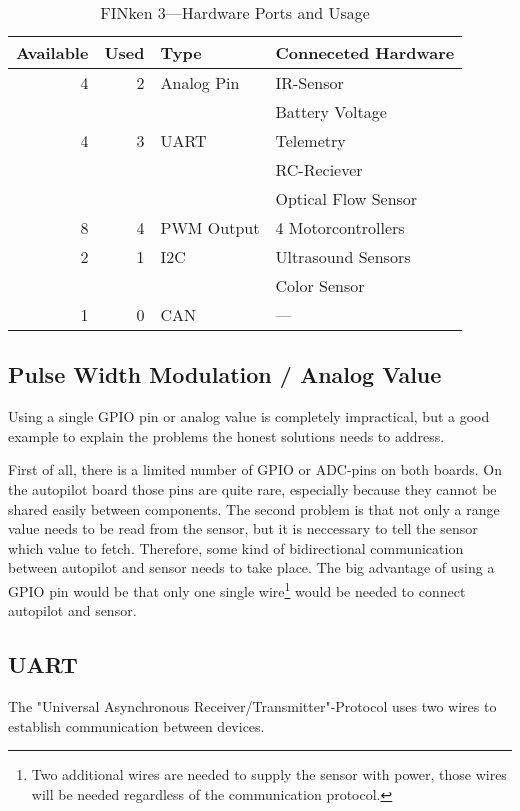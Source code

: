 \begin{table}[h]
	\centering
	\begin{tabular}{|r|r | l | l|}
		\hline
		Available  & Used & Type       & Conneceted Hardware \\ \hline \hline
		4          &   2  & Analog Pin & IR-Sensor \\
		           &      &            & Battery Voltage \\ \hline
		4          &   3  & UART       & Telemetry \\
		           &      &            & RC-Reciever\\
		           &      &            & Optical Flow Sensor\\ \hline
		8          &   4  & PWM Output & 4 Motorcontrollers\\ \hline
		2          &   1  & I2C        & Ultrasound Sensors\\ \hline
		           &      &            & Color Sensor\\ \hline
		1          &   0  & CAN        & — \\ \hline
	\end{tabular}
	\caption{FINken 3—Hardware Ports and Usage}
	\label{hwconnection}
\end{table}

\subsection{Pulse Width Modulation / Analog Value}
Using a single GPIO pin or analog value is completely impractical, but a good example to explain the problems the honest solutions needs to address.

First of all, there is a limited number of GPIO or ADC-pins on both boards.
On the autopilot board those pins are quite rare, especially because they cannot be shared easily between components.
The second problem is that not only a range value needs to be read from the sensor, but it is neccessary to tell the sensor which value to fetch.
Therefore, some kind of bidirectional communication between autopilot and sensor needs to take place.
The big advantage of using a GPIO pin would be that only one single wire\footnote{Two additional wires are needed to supply the sensor with power, those wires will be needed regardless of the communication protocol.} would be needed to connect autopilot and sensor.

\subsection{UART}
The "Universal Asynchronous Receiver/Transmitter"-Protocol uses two wires to establish communication between devices.
\cite{wingen_automatic_2004}

